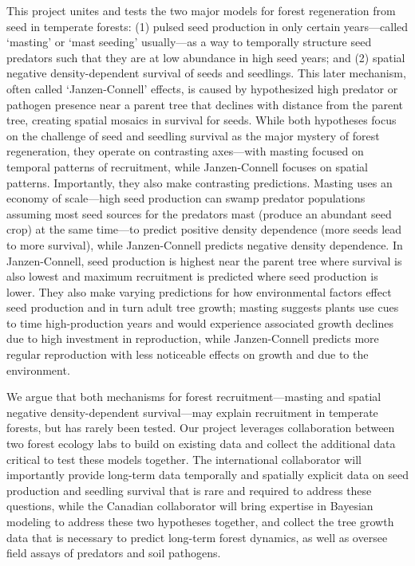 \documentclass[11pt]{article}
\begin{document}
This project unites and tests the two major models for forest regeneration from seed in temperate forests: (1) pulsed seed production in only certain years---called `masting' or `mast seeding' usually---as a way to temporally structure seed predators such that they are at low abundance in high seed years; and (2) spatial negative density-dependent survival of seeds and seedlings. This later mechanism, often called `Janzen-Connell' effects, is caused by hypothesized high predator or pathogen presence near a parent tree that declines with distance from the parent tree, creating spatial mosaics in survival for seeds. While both hypotheses focus on the challenge of seed and seedling survival as the major mystery of forest regeneration, they operate on contrasting axes---with masting focused on temporal patterns of recruitment, while Janzen-Connell focuses on spatial patterns. Importantly, they also make contrasting predictions. Masting uses an economy of scale---high seed production can swamp predator populations assuming most seed sources for the predators mast (produce an abundant seed crop) at the same time---to predict positive density dependence (more seeds lead to more survival), while Janzen-Connell predicts negative density dependence. In Janzen-Connell, seed production is highest near the parent tree where survival is also lowest and maximum recruitment is predicted where seed production is lower. They also make varying predictions for how environmental factors effect seed production and in turn adult tree growth; masting suggests plants use cues to time high-production years and would experience associated growth declines due to high investment in reproduction, while Janzen-Connell predicts more regular reproduction with less noticeable effects on growth and due to the environment. 

We argue that both mechanisms for forest recruitment---masting and spatial negative density-dependent survival---may explain recruitment in temperate forests, but has rarely been tested. Our project leverages collaboration between two forest ecology labs to build on existing data and collect the additional data critical to test these models together. The international collaborator will importantly provide long-term data temporally and spatially explicit data on seed production and seedling survival that is rare and required to address these questions, while the Canadian collaborator will bring expertise in Bayesian modeling to address these two hypotheses together, and collect the tree growth data that is necessary to predict long-term forest dynamics, as well as oversee field assays of predators and soil pathogens. 
\end{document}
